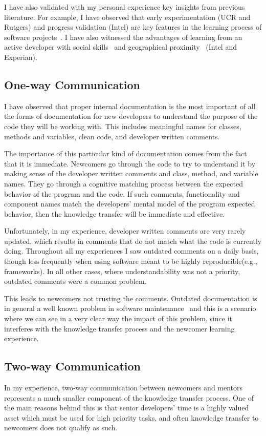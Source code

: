 \documentclass[12pt, letterpaper]{article}
\begin{document}
I have also validated with my personal experience key insights from previous literature. 
For example, I have observed that early experimentation (UCR and Rutgers) and progress validation (Intel) are key features
in the learning process of software projects~\cite{Dagenais10}. I have also witnessed the advantages of 
learning from an active developer with social skills~\cite{Steinmacher12}
and geographical proximity~\cite{Whitworth06} (Intel and Experian). 

\subsection{One-way Communication}
I have observed that proper internal documentation is the most 
important of all the forms of documentation for new developers to understand the purpose of the code they will
be working with. This includes meaningful names for classes, 
methods and variables, clean code, and developer written
comments.

The importance of this particular kind of documentation comes from the fact that it is immediate.
Newcomers go through the code to try to understand it by making sense of the 
developer written comments and class, method, and variable names. They go through
a cognitive matching process between the expected behavior of the program and the code. 
If such comments, functionality and component names match the developers' mental model 
of the program expected behavior, then the knowledge transfer will be immediate and effective.

Unfortunately, in my experience, developer written comments are very rarely updated, which results in 
comments that do not match what the code is currently doing. Throughout all my experiences 
I saw outdated comments on a daily basis, though less frequently when using software 
meant to be highly reproducible(e.g., frameworks). In all other cases,
where understandability was not a priority, outdated comments were a common problem.

This leads to newcomers not 
trusting the comments.
Outdated documentation is in general a well known problem in software maintenance~\cite{lethbridge03} and this is a scenario
where we can see in a very clear way the impact of this problem, since it interferes with the 
knowledge transfer process and the newcomer learning experience.


\subsection{Two-way Communication}
In my experience, two-way communication between newcomers and mentors
represents a much smaller component of the knowledge transfer process. One of the main reasons behind this is that
senior developers' time is a highly valued asset which must be used for high priority tasks, and often knowledge transfer to newcomers does not qualify as such.
\end{document}
